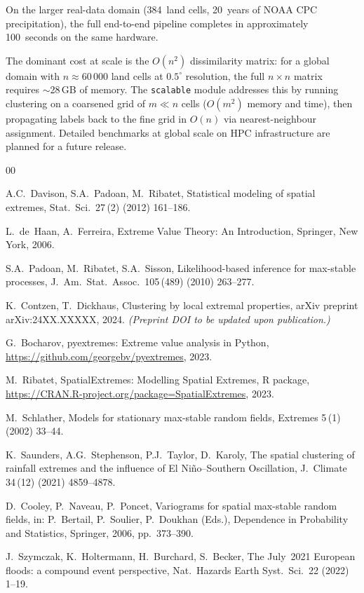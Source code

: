 \documentclass[preprint,12pt,a4paper]{elsarticle}
\begin{document}
On the larger real-data domain (384~land cells, 20~years of NOAA CPC
precipitation), the full end-to-end pipeline completes in
approximately 100~seconds on the same hardware.

The dominant cost at scale is the $O(n^2)$ dissimilarity matrix:
for a global domain with $n \approx 60\,000$ land cells at
$0.5^\circ$ resolution, the full $n \times n$ matrix requires
$\sim$28\,GB of memory.  The \texttt{scalable} module addresses
this by running clustering on a coarsened grid of $m \ll n$ cells
($O(m^2)$ memory and time), then propagating labels back to the
fine grid in $O(n)$ via nearest-neighbour assignment.  Detailed
benchmarks at global scale on HPC infrastructure are planned for a
future release.

\begin{thebibliography}{00}

A.C.~Davison, S.A.~Padoan, M.~Ribatet,
Statistical modeling of spatial extremes,
Stat.\ Sci.\ 27\,(2) (2012) 161--186.

L.~de~Haan, A.~Ferreira,
Extreme Value Theory: An Introduction,
Springer, New York, 2006.

S.A.~Padoan, M.~Ribatet, S.A.~Sisson,
Likelihood-based inference for max-stable processes,
J.\ Am.\ Stat.\ Assoc.\ 105\,(489) (2010) 263--277.

K.~Contzen, T.~Dickhaus,
Clustering by local extremal properties,
arXiv preprint arXiv:24XX.XXXXX, 2024.
\textit{(Preprint DOI to be updated upon publication.)}

G.~Bocharov,
pyextremes: Extreme value analysis in Python,
\url{https://github.com/georgebv/pyextremes}, 2023.

M.~Ribatet,
SpatialExtremes: Modelling Spatial Extremes,
R package, \url{https://CRAN.R-project.org/package=SpatialExtremes}, 2023.

M.~Schlather,
Models for stationary max-stable random fields,
Extremes 5\,(1) (2002) 33--44.

K.~Saunders, A.G.~Stephenson, P.J.~Taylor, D.~Karoly,
The spatial clustering of rainfall extremes and the influence of
El Ni\~{n}o--Southern Oscillation,
J.\ Climate 34\,(12) (2021) 4859--4878.

D.~Cooley, P.~Naveau, P.~Poncet,
Variograms for spatial max-stable random fields,
in: P.~Bertail, P.~Soulier, P.~Doukhan (Eds.),
Dependence in Probability and Statistics,
Springer, 2006, pp.~373--390.

J.~Szymczak, K.~Holtermann, H.~Burchard, S.~Becker,
The July~2021 European floods: a compound event perspective,
Nat.\ Hazards Earth Syst.\ Sci.\ 22 (2022) 1--19.

\end{thebibliography}
\end{document}
